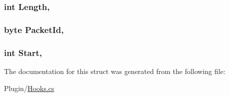 \subsubsection[{Length}]{\setlength{\rightskip}{0pt plus 5cm}int Length\hspace{0.3cm}{\ttfamily [get]}, {\ttfamily [set]}}\label{structOTA_1_1Plugin_1_1HookArgs_1_1ReceiveNetMessage_a9fde862c8bc443d7a6872a487ec265a3}
\hypertarget{structOTA_1_1Plugin_1_1HookArgs_1_1ReceiveNetMessage_a124a1326124b63ed7008a151e98c4372}{}
\subsubsection[{Packet\+Id}]{\setlength{\rightskip}{0pt plus 5cm}byte Packet\+Id\hspace{0.3cm}{\ttfamily [get]}, {\ttfamily [set]}}\label{structOTA_1_1Plugin_1_1HookArgs_1_1ReceiveNetMessage_a124a1326124b63ed7008a151e98c4372}
\hypertarget{structOTA_1_1Plugin_1_1HookArgs_1_1ReceiveNetMessage_a0b2c355629c0c41a383ab8db641304ee}{}
\subsubsection[{Start}]{\setlength{\rightskip}{0pt plus 5cm}int Start\hspace{0.3cm}{\ttfamily [get]}, {\ttfamily [set]}}\label{structOTA_1_1Plugin_1_1HookArgs_1_1ReceiveNetMessage_a0b2c355629c0c41a383ab8db641304ee}


The documentation for this struct was generated from the following file\+:\begin{DoxyCompactItemize}
\item 
Plugin/\hyperlink{Hooks_8cs}{Hooks.\+cs}\end{DoxyCompactItemize}
